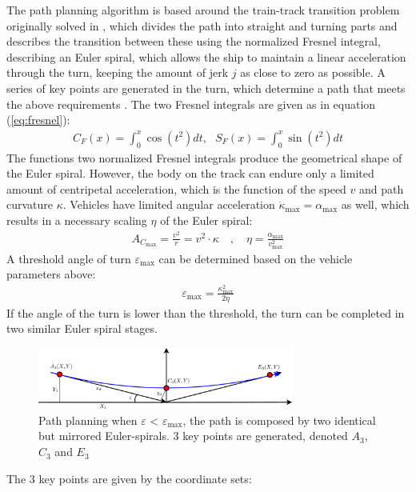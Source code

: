 \documentclass{ifacconf}
\begin{document}
The path planning algorithm is based around the train-track transition problem originally solved in \citep{Art:1}, which divides the path into straight and turning parts and describes the transition between these using the normalized Fresnel integral, describing an Euler spiral, which allows the ship to maintain a linear acceleration through the turn, keeping the amount of jerk $j$ as close to zero as possible. A series of key points are generated in the turn, which determine a path that meets the above requirements \citep{Art:2}. The two Fresnel integrals are given as in equation (\ref{eq:fresnel}):
\begin{align}
C_F(x) = \int_0^x \cos(t^2)dt,\,\,\,\,S_F(x) = \int_0^x \sin(t^2)dt
\label{eq:fresnel}
\end{align}
The functions two normalized Fresnel integrals produce the geometrical shape of the Euler spiral. However, the body on the track can endure only a limited amount of centripetal acceleration, which is the function of the speed $v$ and path curvature $\kappa$. Vehicles have limited angular acceleration $\dot{\kappa}_\text{max} = \alpha_\text{max}$ as well, which results in a necessary scaling $\eta$ of the Euler spiral:
\begin{align}
A_{C_\text{max}} = \frac{v^2}{r} = v^2 \cdot \kappa \quad , \quad \eta = \frac{\alpha_\text{max}}{v^2_\text{max}}
\end{align}
A threshold angle of turn $\varepsilon_\text{max}$ can be determined based on the vehicle parameters above:
\begin{align}
\varepsilon_\text{max} = \frac{\kappa^2_\text{max}}{2\eta}
\end{align}
If the angle of the turn is lower than the threshold, the turn can be completed in two similar Euler spiral stages.
\begin{figure}
	\begin{center}
		\includegraphics[width=8.4cm]{img/3Points} %
		\caption{Path planning when $\varepsilon$ < $\varepsilon_\text{max}$, the path is composed by two identical but mirrored Euler-spirals. 3 key points are generated, denoted $A_3$, $C_3$ and $E_3$}
		\label{fig:3points}
	\end{center}
\end{figure}
The 3 key points are given by the coordinate sets:
\end{document}
